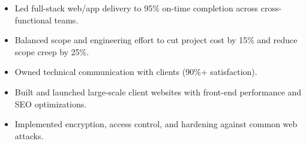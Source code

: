 \begin{itemize}
\item Led full-stack web/app delivery to 95\% on-time completion across cross-functional teams.
\item Balanced scope and engineering effort to cut project cost by 15\% and reduce scope creep by 25\%.
\item Owned technical communication with clients (90\%+ satisfaction).
\end{itemize}
\divider

\begin{itemize}
\item Built and launched large-scale client websites with front-end performance and SEO optimizations.
\item Implemented encryption, access control, and hardening against common web attacks.
\end{itemize}

\newpage
\switchcolumn
